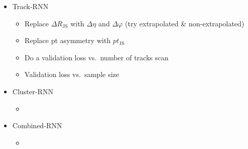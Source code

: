 \begin{itemize}
\item Track-RNN
  \begin{itemize}
  \item Replace $\Delta R_\mathrm{JS}$ with $\Delta \eta$ and $\Delta \varphi$
    (try extrapolated \& non-extrapolated)
  \item Replace pt asymmetry with $pt_\mathrm{JS}$
  \item Do a validation loss vs.\ number of tracks scan
  \item Validation loss vs.\ sample size
  \end{itemize}

\item Cluster-RNN
  \begin{itemize}
  \item
  \end{itemize}

\item Combined-RNN
  \begin{itemize}
  \item
  \end{itemize}
\end{itemize}


